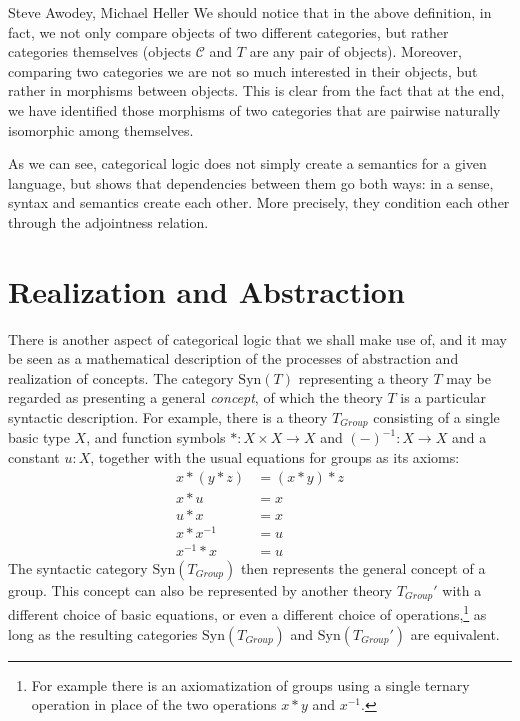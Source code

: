 \begin{artengenv2auth}{Steve Awodey, Michael Heller}
We should notice that in the above definition, in fact, we not only compare objects of two different categories, but rather categories themselves (objects $\mathcal{C}$ and $T$ are any pair of objects). Moreover, comparing two categories we are not so much interested in their objects, but rather in morphisms between objects. This is clear from the fact that at the end, we have identified those morphisms of two categories that are pairwise naturally isomorphic among themselves.

As we can see, categorical logic does not simply create a semantics for a given language, but shows that dependencies between them go both ways: in a sense, syntax and semantics create each other. More precisely, they condition each other through the adjointness relation.

%
%
\section{Realization and Abstraction}

There is another aspect of categorical logic that we shall make use of, and it may be seen as a mathematical description of the processes of abstraction and realization of concepts. The category $\mathrm{Syn}(T)$ representing a theory $T$ may be regarded as presenting a general \emph{concept}, of which the theory $T$ is a particular syntactic description.  For example, there is a theory $T_{Group}$ consisting of 
a single basic type $X$, and function symbols $* : X\times X\to X$ and $(-)^{-1} : X \to X$ and a constant $u : X$, together with the usual equations for groups as its axioms:
\begin{align*}
x*(y*z) &= (x*y)*z\\
x*u &= x\\
u*x &= x\\
x*x^{-1} &= u\\
x^{-1}*x &=u
\end{align*}
The syntactic category $\mathrm{Syn}(T_{Group})$ then represents the general concept of a group.  This concept can also be represented by another theory $T_{Group}'$ with a different choice of basic equations, or even a different choice of operations,\footnote{For example there is an axiomatization of groups using a single ternary operation in place of the two operations $x*y$ and $x^{-1}$.} as long as the resulting categories $\mathrm{Syn}(T_{Group})$  and $\mathrm{Syn}(T_{Group}')$ are equivalent.


\end{artengenv2auth}
